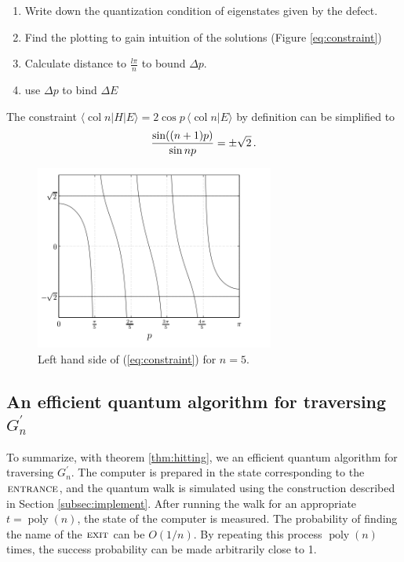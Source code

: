 \documentclass[aps,11pt,twoside,nofootinbib,tightenlines,superscriptaddress,preprintnumbers]{revtex4}
\newcommand{\<}{\langle}
\renewcommand{\>}{\rangle}
\newcommand{\be}{\begin{equation}}
\newcommand{\ee}{\end{equation}}
\newcommand{\ent}{{\textsc{entrance}}}
\newcommand{\exit}{{\textsc{exit}}}
\newcommand{\poly}{\mathop{\mathrm{poly}}\nolimits}
\newcommand{\col}{\mathop{\mathrm{col}}\nolimits}
\newenvironment{proof sketch}
{\trivlist\item\noindent{\bf Proof sketch}~}
{\qed\endtrivlist}
\begin{document}
\begin{proof sketch}

\begin{enumerate}
    \item Write down the quantization condition of eigenstates given by the defect.
    \item Find the plotting to gain intuition of the solutions (Figure \ref{eq:constraint})
    \item Calculate distance to $\frac{l\pi}{n}$ to bound $\Delta p$.
    \item use $\Delta p$ to bind $\Delta E$
\end{enumerate}

The constraint 
$\<\col n|H|E\> = 2 \cos p \, \<\col n|E\>$
by definition can be simplified to 
\be
  {\sin((n+1)p) \over \sin np} = \pm \sqrt 2
\,.
\ee
\label{eq:constraint}


\begin{figure}
\includegraphics[width=0.7\textwidth]{cons.png}
\caption{Left hand side of (\ref{eq:constraint}) for $n=5$.}
\label{fig:constraint}
\end{figure}

\end{proof sketch}


\subsection{An efficient quantum algorithm for traversing $G^{\prime}_n$}
To summarize, with theorem \ref{thm:hitting}, we an efficient quantum algorithm for traversing $G^{\prime}_n$. The computer is prepared in the state corresponding to the $\ent$, and the quantum walk is simulated using the construction described in Section \ref{subsec:implement}.  After
running the walk for an appropriate $t=\poly(n)$, the state of the computer is
measured. The probability of finding the name of the $\exit$ can be $O(1/n)$.  By
repeating this process $\poly(n)$ times, the success probability can be
made arbitrarily close to 1. 
\end{document}
